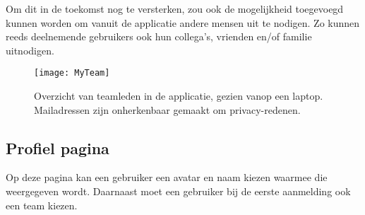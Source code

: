 Om dit in de toekomst nog te versterken, zou ook de mogelijkheid toegevoegd kunnen worden om vanuit de applicatie andere mensen uit te nodigen. Zo kunnen reeds deelnemende gebruikers ook hun collega's, vrienden en/of familie uitnodigen.

\begin{figure}[h]
    \caption[Overzicht van teamleden]{Overzicht van teamleden in de applicatie, gezien vanop een laptop. Mailadressen zijn onherkenbaar gemaakt om privacy-redenen.}
    \texttt{[image: MyTeam]}
    \label{fig:team}
\end{figure}

\subsection{Profiel pagina}

Op deze pagina kan een gebruiker een avatar en naam kiezen waarmee die weergegeven wordt. Daarnaast moet een gebruiker bij de eerste aanmelding ook een team kiezen.